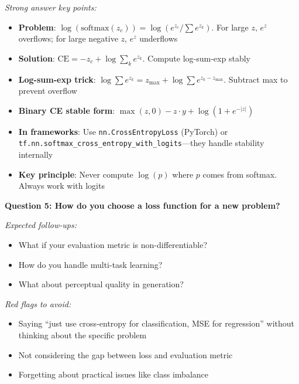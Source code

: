 \documentclass[../../main.tex]{subfiles}
\begin{document}
\begin{interviewquestions}
\textit{Strong answer key points:}
\begin{itemize}
    \item \textbf{Problem}: $\log(\text{softmax}(z_c)) = \log(e^{z_c} / \sum e^{z_k})$. For large $z$, $e^z$ overflows; for large negative $z$, $e^z$ underflows
    \item \textbf{Solution}: $\text{CE} = -z_c + \log\sum_k e^{z_k}$. Compute log-sum-exp stably
    \item \textbf{Log-sum-exp trick}: $\log\sum e^{z_k} = z_{\max} + \log\sum e^{z_k - z_{\max}}$. Subtract max to prevent overflow
    \item \textbf{Binary CE stable form}: $\max(z,0) - z \cdot y + \log(1 + e^{-|z|})$
    \item \textbf{In frameworks}: Use \texttt{nn.CrossEntropyLoss} (PyTorch) or \texttt{tf.nn.softmax\_cross\_entropy\_with\_logits}---they handle stability internally
    \item \textbf{Key principle}: Never compute $\log(p)$ where $p$ comes from softmax. Always work with logits
\end{itemize}

\vspace{0.5em}
\textbf{Question 5: How do you choose a loss function for a new problem?}

\textit{Expected follow-ups:}
\begin{itemize}
    \item What if your evaluation metric is non-differentiable?
    \item How do you handle multi-task learning?
    \item What about perceptual quality in generation?
\end{itemize}

\textit{Red flags to avoid:}
\begin{itemize}
    \item Saying ``just use cross-entropy for classification, MSE for regression'' without thinking about the specific problem
    \item Not considering the gap between loss and evaluation metric
    \item Forgetting about practical issues like class imbalance
\end{itemize}


\end{interviewquestions}
\end{document}
